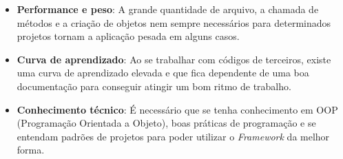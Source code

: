         \begin{itemize}
            \item \textbf{Performance e peso}: A grande quantidade de arquivo, a chamada de métodos e a criação de objetos nem sempre necessários para determinados projetos tornam a aplicação pesada em alguns casos.

            \item \textbf{Curva de aprendizado}: Ao se trabalhar com códigos de terceiros, existe uma curva de aprendizado elevada e que fica dependente de uma boa documentação para conseguir atingir um bom ritmo de trabalho.

            \item \textbf{Conhecimento técnico}: É necessário que se tenha conhecimento em OOP (Programação Orientada a Objeto), boas práticas de programação e se entendam padrões de projetos para poder utilizar o \emph{Framework} da melhor forma.

        \end{itemize}
